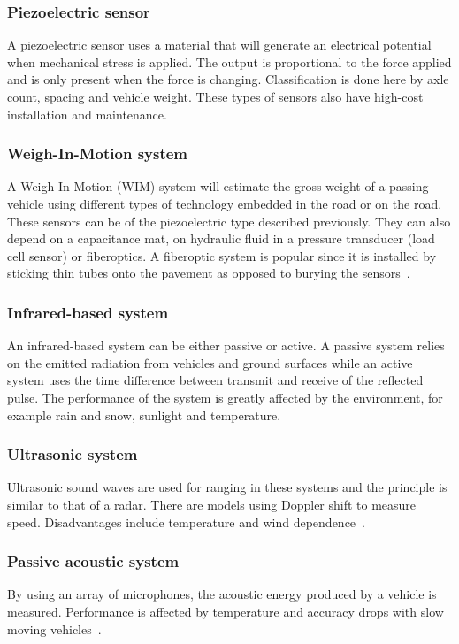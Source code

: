 \subsubsection{Piezoelectric sensor}
A piezoelectric sensor uses a material that will generate an electrical potential when mechanical stress is applied. The output is proportional to the force applied and is only present when the force is changing. Classification is done here by axle count, spacing and vehicle weight. These types of sensors also have high-cost installation and maintenance. 

\subsubsection{Weigh-In-Motion system}
A Weigh-In Motion (WIM) system will estimate the gross weight of a passing vehicle using different types of technology embedded in the road or on the road. These sensors can be of the piezoelectric type described previously. They can also depend on a capacitance mat, on hydraulic fluid in a pressure transducer (load cell sensor) or fiberoptics. A fiberoptic system is popular since it is installed by sticking thin tubes onto the pavement as opposed to burying the sensors~\cite{path2007}.

\subsubsection{Infrared-based system}
An infrared-based system can be either passive or active. A passive system relies on the emitted radiation from vehicles and ground surfaces while an active system uses the time difference between transmit and receive of the reflected pulse. The performance of the system is greatly affected by the environment, for example rain and snow, sunlight and temperature.

\subsubsection{Ultrasonic system}
Ultrasonic sound waves are used for ranging in these systems and the principle is similar to that of a radar. There are models using Doppler shift to measure speed. Disadvantages include temperature and wind dependence~\cite{path2007}.

\subsubsection{Passive acoustic system}
By using an array of microphones, the acoustic energy produced by a vehicle is measured. Performance is affected by temperature and accuracy drops with slow moving vehicles~\cite{path2007}.

